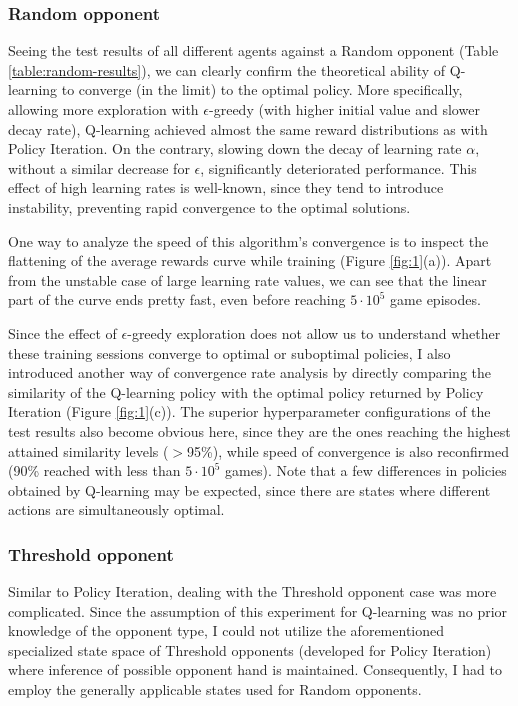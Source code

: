 \subsubsection{Random opponent}

Seeing the test results of all different agents against a Random opponent (Table \ref{table:random-results}), we can clearly confirm the theoretical ability of Q-learning to converge (in the limit) to the optimal policy. More specifically, allowing more exploration with $\epsilon$-greedy (with higher initial value and slower decay rate), Q-learning achieved almost the same reward distributions as with Policy Iteration. On the contrary, slowing down the decay of learning rate $\alpha$, without a similar decrease for $\epsilon$, significantly deteriorated performance. This effect of high learning rates is well-known, since they tend to introduce instability, preventing rapid convergence to the optimal solutions.

One way to analyze the speed of this algorithm's convergence is to inspect the flattening of the average rewards curve while training (Figure \ref{fig:1}(a)). Apart from the unstable case of large learning rate values, we can see that the linear part of the curve ends pretty fast, even before reaching $5\cdot10^5$ game episodes. 

Since the effect of $\epsilon$-greedy exploration does not allow us to understand whether these training sessions converge to optimal or suboptimal policies, I also introduced another way of convergence rate analysis by directly comparing the similarity of the Q-learning policy with the optimal policy returned by Policy Iteration (Figure \ref{fig:1}(c)). The superior hyperparameter configurations of the test results also become obvious here, since they are the ones reaching the highest attained similarity levels ($>$95\%), while speed of convergence is also reconfirmed (90\% reached with less than $5\cdot10^5$ games). Note that a few differences in policies obtained by Q-learning may be expected, since there are states where different actions are simultaneously optimal.

\subsubsection{Threshold opponent}

Similar to Policy Iteration, dealing with the Threshold opponent case was more complicated. Since the assumption of this experiment for Q-learning was no prior knowledge of the opponent type, I could not utilize the aforementioned specialized state space of Threshold opponents (developed for Policy Iteration) where inference of possible opponent hand is maintained. Consequently, I had to employ the generally applicable states used for Random opponents.

